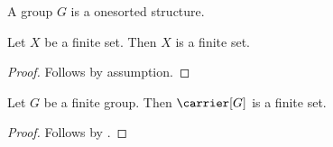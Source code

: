 

\begin{struct}\label{notion_finite_group}
    A group $G$ is a onesorted structure.
\end{struct}

\begin{proposition}\label{notion_finite_set_reading}
    Let $X$ be a finite set.
    Then $X$ is a finite set.
\end{proposition}
\begin{proof}
    Follows by assumption.
\end{proof}

\begin{proposition}\label{notion_finite_group_reading}
    Let $G$ be a finite group.
    Then $\carrier[G]$ is a finite set.
\end{proposition}
\begin{proof}
    Follows by .
\end{proof}
